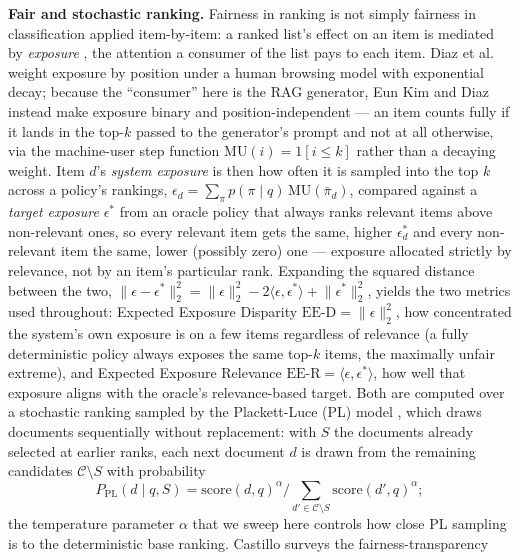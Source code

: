\documentclass[10pt,twocolumn]{article}
\begin{document}
\textbf{Fair and stochastic ranking.} Fairness in ranking is not simply fairness in
classification applied item-by-item: a ranked list's effect on an item is mediated by
\emph{exposure} \cite{diaz2020evaluating}, the attention a consumer of the list pays to
each item. Diaz et al.\ \cite{diaz2020evaluating} weight exposure by position under a
human browsing model with exponential decay; because the ``consumer'' here is the RAG
generator, Eun Kim and Diaz \cite{eunkim2025fairrag} instead make exposure binary and
position-independent --- an item counts fully if it lands in the top-$k$ passed to the
generator's prompt and not at all otherwise, via the machine-user step function
$\mathrm{MU}(i) = 1[i \le k]$ rather than a decaying weight. Item $d$'s
\emph{system exposure} is then how often it is sampled into the top $k$ across a policy's
rankings, $\epsilon_d = \sum_{\pi} p(\pi \mid q)\,\mathrm{MU}(\bar\pi_d)$, compared against
a \emph{target exposure} $\epsilon^*$ from an oracle policy that always ranks relevant items
above non-relevant ones, so every relevant item gets the same, higher $\epsilon^*_d$ and
every non-relevant item the same, lower (possibly zero) one --- exposure allocated strictly
by relevance, not by an item's particular rank. Expanding the squared distance between the
two, $\lVert \epsilon - \epsilon^* \rVert_2^2 = \lVert \epsilon \rVert_2^2
- 2\langle \epsilon, \epsilon^* \rangle + \lVert \epsilon^* \rVert_2^2$, yields the two
metrics used throughout: Expected Exposure Disparity
$\mathrm{EE\text{-}D} = \lVert \epsilon \rVert_2^2$, how concentrated the system's own
exposure is on a few items regardless of relevance (a fully deterministic policy always
exposes the same top-$k$ items, the maximally unfair extreme), and Expected Exposure
Relevance $\mathrm{EE\text{-}R} = \langle \epsilon, \epsilon^* \rangle$, how well that
exposure aligns with the oracle's relevance-based target. Both are computed over a
stochastic ranking sampled by the Plackett-Luce (PL) model
\cite{plackett1975analysis,luce1959individual}, which draws documents sequentially
without replacement: with $S$ the documents already selected at earlier ranks, each
next document $d$ is drawn from the remaining candidates $\mathcal{C} \setminus S$
with probability
\begin{equation}
P_{\mathrm{PL}}(d \mid q, S) = \mathrm{score}(d,q)^\alpha \Big/ \sum_{d' \in \mathcal{C} \setminus S} \mathrm{score}(d',q)^\alpha;
\label{eq:pl}
\end{equation}
the temperature parameter
$\alpha$ that we sweep here
controls how close PL sampling is to the deterministic base ranking. Castillo \cite{castillo2018fairness} surveys the fairness-transparency
\end{document}
